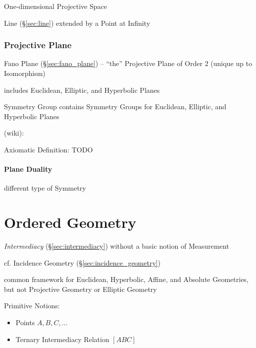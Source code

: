 One-dimensional Projective Space

Line (\S\ref{sec:line}) extended by a Point at Infinity



\subsubsection{Projective Plane}\label{sec:projective_plane}

Fano Plane (\S\ref{sec:fano_plane}) -- ``the'' Projective Plane of Order $2$
(unique up to Isomorphism)

includes Euclidean, Elliptic, and Hyperbolic Planes

Symmetry Group contains Symmetry Groups for Euclidean, Elliptic, and
Hyperbolic Planes

(wiki):

Axiomatic Definition: TODO



\paragraph{Plane Duality}\label{sec:plane_duality}\hfill

different type of Symmetry %



\section{Ordered Geometry}\label{sec:ordered_geometry}

\emph{Intermediacy} (\S\ref{sec:intermediacy}) without a basic notion of
Measurement

\fist cf. Incidence Geometry (\S\ref{sec:incidence_geometry})

common framework for Euclidean, Hyperbolic, Affine, and Absolute Geometries, but
not Projective Geometry or Elliptic Geometry

Primitive Notions:
\begin{itemize}
  \item Points $A, B, C, \ldots$
  \item Ternary Intermediacy Relation $[ABC]$
\end{itemize}

